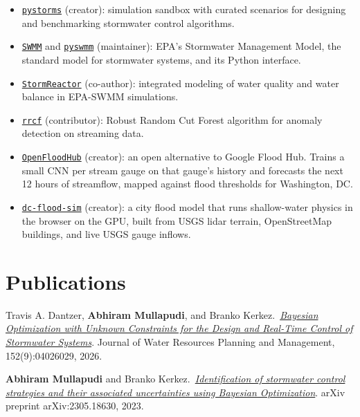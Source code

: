 \documentclass[a4paper,11pt]{article}
\newcommand{\years}[1]{%
  {\reversemarginpar\strut\marginnote{{\small#1}}}%
}
\begin{document}
\begin{itemize}
	\setlength\itemsep{1mm}
	\item \href{https://klabum.github.io/pystorms/}{\texttt{pystorms}} (creator): simulation sandbox with curated scenarios for designing and benchmarking stormwater control algorithms.
	\item \href{https://github.com/OpenWaterAnalytics/Stormwater-Management-Model}{\texttt{SWMM}} and \href{https://github.com/OpenWaterAnalytics/pyswmm}{\texttt{pyswmm}} (maintainer): EPA's Stormwater Management Model, the standard model for stormwater systems, and its Python interface.
	\item \href{https://github.com/kLabUM/StormReactor}{\texttt{StormReactor}} (co-author): integrated modeling of water quality and water balance in EPA-SWMM simulations.
	\item \href{https://github.com/kLabUM/rrcf}{\texttt{rrcf}} (contributor): Robust Random Cut Forest algorithm for anomaly detection on streaming data.
	\item \href{https://github.com/abhiramm7/openfloodhub}{\texttt{OpenFloodHub}} (creator): an open alternative to Google Flood Hub. Trains a small CNN per stream gauge on that gauge's history and forecasts the next 12 hours of streamflow, mapped against flood thresholds for Washington, DC.
	\item \href{https://github.com/abhiramm7/dc-flood-sim}{\texttt{dc-flood-sim}} (creator): a city flood model that runs shallow-water physics in the browser on the GPU, built from USGS lidar terrain, OpenStreetMap buildings, and live USGS gauge inflows.
\end{itemize}

\section*{Publications}
\years{2026} Travis A. Dantzer, \textbf{Abhiram Mullapudi}, and Branko Kerkez.\ \href{https://ascelibrary.org/doi/abs/10.1061/JWRMD5.WRENG-7336}{\emph{Bayesian Optimization with Unknown Constraints for the Design and Real-Time Control of Stormwater Systems}}. Journal of Water Resources Planning and Management, 152(9):04026029, 2026.\\[.1cm]

\years{2023} \textbf{Abhiram Mullapudi} and Branko Kerkez.\ \href{https://arxiv.org/abs/2305.18630}{\emph{Identification of stormwater control strategies and their associated uncertainties using Bayesian Optimization}}. arXiv preprint arXiv:2305.18630, 2023.\\[.1cm]
\end{document}
